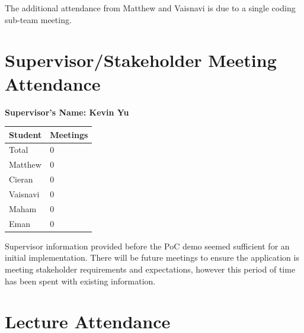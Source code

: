 \documentclass{article}
\begin{document}
The additional attendance from Matthew and Vaisnavi is due to a single coding sub-team meeting.

\section{Supervisor/Stakeholder Meeting Attendance}


\noindent \textbf{Supervisor's Name: Kevin Yu} 
\begin{table}[H]
\centering
\begin{tabular}{ll}
\toprule
\textbf{Student} & \textbf{Meetings}\\
\midrule
Total & 0\\
Matthew & 0\\
Cieran & 0\\
Vaisnavi & 0\\
Maham & 0\\
Eman & 0\\
\bottomrule
\end{tabular}
\end{table}

Supervisor information provided before the PoC demo seemed sufficient for an initial implementation. There will be future meetings to ensure the application is meeting stakeholder requirements and expectations, however this period of time has been spent with existing information.
\section{Lecture Attendance}

\end{document}
